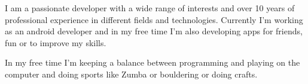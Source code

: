 

\begin{cvparagraph}

I am a passionate developer with a wide range of interests and over 10 years of professional experience in different fields and technologies. Currently I'm working as an android developer and in my free time I'm also developing apps for friends, fun or to improve my skills. 

In my free time I'm keeping a balance between programming and playing on the computer and doing sports like Zumba or bouldering or doing crafts.
\end{cvparagraph}
